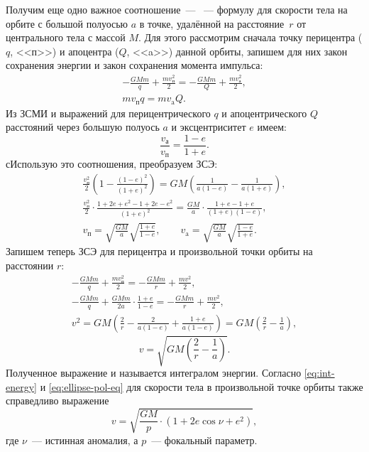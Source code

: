 Получим еще одно важное соотношение~--- ~--- формулу для скорости тела на орбите с большой полуосью $a$ в точке, удалённой на расстояние~$r$ от центрального тела с массой $M$. Для этого рассмотрим  сначала точку перицентра ($q$, <<п>>) и апоцентра ($Q$, <<a>>) данной орбиты, запишем для них закон сохранения энергии и закон сохранения момента импульса:
\begin{gather*}
	-\frac{GMm}{q} + \frac{m v^2_\text{п}}{2} = -\frac{GMm}{Q} + \frac{m v^2_\text{а}}{2},\\
	mv_\text{п}q = mv_\text{a}Q.
\end{gather*}
Из ЗСМИ и выражений для перицентрического $q$ и апоцентрического $Q$ расстояний через большую полуось $a$ и эксцентриситет $e$ имеем:
\begin{equation*}
	\frac{v_\text{а}}{v_\text{п}} = \frac{1 - e}{1 + e}.
\end{equation*}сИспользую это соотношения, преобразуем ЗСЭ:
\begin{gather}
	\frac{v_\text{п}^2}{2} \left( 1 - \frac{(1 -e)^2}{(1 + e)^2} \right) = GM \left( \frac{1}{a(1-e)} - \frac{1}{a(1+e)} \right),\\
	\frac{v_\text{п}^2}{2} \cdot \frac{ 1 + 2e + e^2 - 1 + 2e - e^2}{(1+e)^2} = \frac{GM}{a} \cdot \frac{1 + e - 1 +  e}{(1+e)(1-e)},\\
	v_\text{п} = \sqrt{\frac{GM}{a}}\sqrt{\frac{1+e}{1-e}}, \quad \quad v_\text{a} = \sqrt{\frac{GM}{a}}\sqrt{\frac{1-e}{1+e}}.
\end{gather}
Запишем теперь ЗСЭ для перицентра и произвольной точки орбиты на расстоянии $r$:
\begin{gather*}
	-\frac{GMm}{q} + \frac{m v^2_\text{п}}{2} = -\frac{GMm}{r} + \frac{m v^2}{2},\\
	-\frac{GMm}{q} + \frac{GMm}{2a} \cdot \frac{1+e}{1-e} = -\frac{GMm}{r} + \frac{m v^2}{2},\\
	v^2 = GM \left( \frac{2}{r} - \frac{2}{a(1 - e)} + \frac{1+e}{a (1-e) }\right) = GM \left( \frac{2}{r} - \frac{1}{a} \right),
\end{gather*}
\begin{equation}
	v = \sqrt{ GM \left( \frac{2}{r} - \frac{1}{a} \right)}.
	\label{eq:int-energy}
\end{equation}
Полученное выражение и называется интегралом энергии. Согласно \eqref{eq:int-energy} и \eqref{eq:ellipse-pol-eq} для скорости тела в произвольной точке орбиты также справедливо выражение
\begin{equation}
	v = \sqrt{\frac{GM}{p}\cdot(1 + 2 e \cos \nu + e^2)},
\end{equation}
где $\nu$~--- истинная аномалия, а $p$~--- фокальный параметр.

